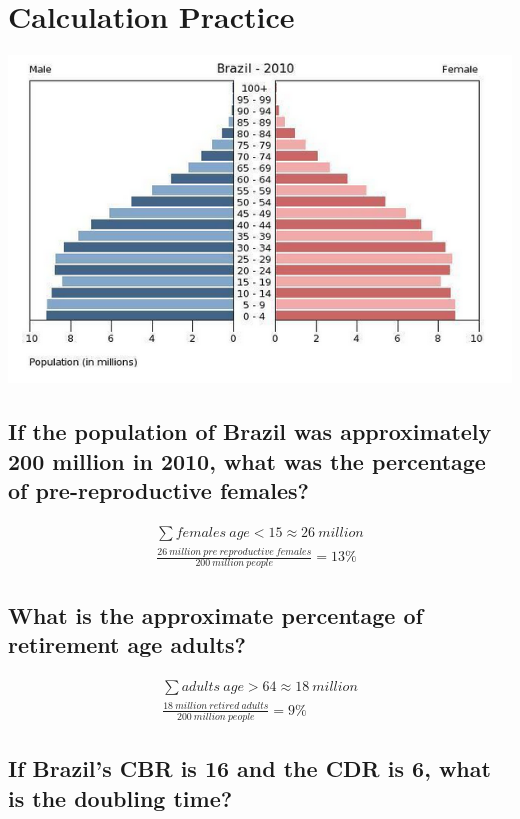 \documentclass{article}
\begin{document}
\section{Calculation Practice}

\includegraphics[width=\textwidth]{images/calculation-practice.png}

\subsection{If the population of Brazil was approximately 200 million in 2010, what was the percentage of pre-reproductive females?}

\begin{gather}
    \sum females\ age<15 \approx 26\ million \\
    \frac{26\ million\ pre\ reproductive\ females}{200\ million\ people} = 13\%
\end{gather}

\subsection{What is the approximate percentage of retirement age adults?}

\begin{gather}
    \sum adults\ age>64 \approx 18\ million \\
    \frac{18\ million\ retired\ adults}{200\ million\ people} = 9\%
\end{gather}

\subsection{If Brazil’s CBR is 16 and the CDR is 6, what is the doubling time?}
\end{document}
